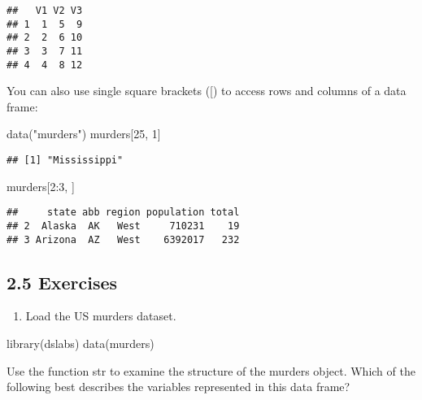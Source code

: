 \documentclass[
]{article}
\newenvironment{Shaded}{\begin{snugshade}}{\end{snugshade}}
\newcommand{\DecValTok}[1]{\textcolor[rgb]{0.00,0.00,0.81}{#1}}
\newcommand{\FunctionTok}[1]{\textcolor[rgb]{0.00,0.00,0.00}{#1}}
\newcommand{\NormalTok}[1]{#1}
\newcommand{\SpecialCharTok}[1]{\textcolor[rgb]{0.00,0.00,0.00}{#1}}
\newcommand{\StringTok}[1]{\textcolor[rgb]{0.31,0.60,0.02}{#1}}
\providecommand{\tightlist}{%
  \setlength{\itemsep}{0pt}\setlength{\parskip}{0pt}}
\begin{document}
\begin{verbatim}
##   V1 V2 V3
## 1  1  5  9
## 2  2  6 10
## 3  3  7 11
## 4  4  8 12
\end{verbatim}

You can also use single square brackets ({[}) to access rows and columns
of a data frame:

\begin{Shaded}
\begin{Highlighting}[]
\FunctionTok{data}\NormalTok{(}\StringTok{"murders"}\NormalTok{)}
\NormalTok{murders[}\DecValTok{25}\NormalTok{, }\DecValTok{1}\NormalTok{]}
\end{Highlighting}
\end{Shaded}

\begin{verbatim}
## [1] "Mississippi"
\end{verbatim}

\begin{Shaded}
\begin{Highlighting}[]
\NormalTok{murders[}\DecValTok{2}\SpecialCharTok{:}\DecValTok{3}\NormalTok{, ]}
\end{Highlighting}
\end{Shaded}

\begin{verbatim}
##     state abb region population total
## 2  Alaska  AK   West     710231    19
## 3 Arizona  AZ   West    6392017   232
\end{verbatim}

\hypertarget{exercises-1}{%
\subsection{2.5 Exercises}\label{exercises-1}}

\begin{enumerate}
\def\labelenumi{\arabic{enumi}.}
\tightlist
\item
  Load the US murders dataset.
\end{enumerate}

\begin{Shaded}
\begin{Highlighting}[]
\FunctionTok{library}\NormalTok{(dslabs)}
\FunctionTok{data}\NormalTok{(murders)}
\end{Highlighting}
\end{Shaded}

Use the function str to examine the structure of the murders object.
Which of the following best describes the variables represented in this
data frame?
\end{document}
